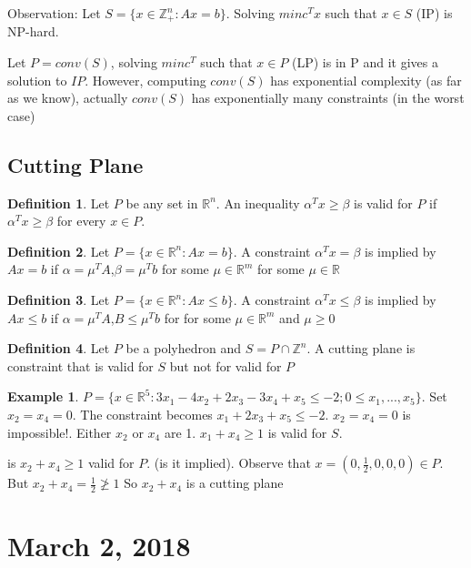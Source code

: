 \documentclass{article}
\theoremstyle{plain}
\theoremstyle{definition}
\newtheorem{eg}{Example}
\newtheorem{defn}{Definition}
\begin{document}
Observation: Let $S = \{x\in\mathbb{Z}^n_+: Ax = b\}$. Solving $min c^Tx$ such that
$x\in S$ (IP) is NP-hard.

Let $P = conv(S)$, solving $min c^T$ such that $x\in P$ (LP) is in P and it gives a
solution to $IP$. However, computing $conv(S)$ has exponential complexity (as far as
we know), actually $conv(S)$ has exponentially many constraints (in the worst case)

\subsection{Cutting Plane}
\begin{defn}
    Let $P$ be any set in $\mathbb{R}^n$. An inequality $\alpha^Tx\geq\beta$ is valid
    for $P$ if $\alpha^Tx\geq\beta$ for every $x\in P$.
\end{defn}

\begin{defn}
    Let $P = \{x\in\mathbb{R}^n: Ax = b\}$. A constraint $\alpha^Tx = \beta$ is implied
    by $Ax = b$ if $\alpha = \mu^TA$,$\beta =\mu^Tb$ for some $\mu\in\mathbb{R}^{m}$ for
    some $\mu\in\mathbb{R}$
\end{defn}

\begin{defn}
    Let $P = \{x\in\mathbb{R}^n: Ax \leq b\}$. A constraint $\alpha^Tx \leq \beta$
    is implied by $Ax \leq b$ if $\alpha = \mu^TA$,$B \leq\mu^Tb$ for for some
    $\mu\in\mathbb{R}^m$ and $\mu\geq 0$
\end{defn}

\begin{defn}
    Let $P$ be a polyhedron and $S = P\cap\mathbb{Z}^n$. A cutting plane is constraint
    that is valid for $S$ but not for valid for $P$
\end{defn}

\begin{eg}
    $P = \{x\in\mathbb{R}^5: 3x_1 - 4x_2 + 2x_3 - 3x_4 + x_5 \leq -2;
    0\leq x_1, ..., x_5\}$. Set $x_2 = x_4 = 0$. The constraint becomes
    $x_1 + 2x_3 + x_5 \leq -2$. $x_2 = x_4 = 0$ is impossible!. Either $x_2$ or
    $x_4$ are 1. $x_1 + x_4\geq 1$ is valid for $S$.
\end{eg}

is $x_2 + x_4 \geq 1$ valid for $P$. (is it implied). Observe that
$x = (0, \frac{1}{2}, 0, 0 , 0)\in P$. But $x_2 + x_4 = \frac{1}{2} \not\geq 1$
So $x_2 + x_4$ is a cutting plane

\section{March 2, 2018}
\end{document}
